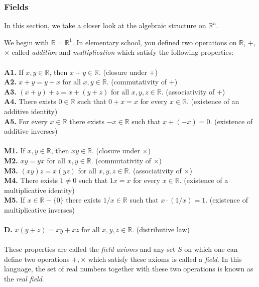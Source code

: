 \documentclass[12pt,letterpaper,reqno]{article}
\numberwithin{equation}{section}
\newcommand{\ti}[1]{\textit{#1}}
\newcommand{\fixme}[1]{{\color{orange}{[#1]}}}
\begin{document}
\subsubsection{Fields}
\fixme{Renumber this section and add proofs.}
In this section, we take a closer look at the algebraic structure on $\mathbb{R}^n$. 

We begin with $\mathbb{R}=\mathbb{R}^1$. In elementary school, you defined two operations on $\mathbb{R}$, $+$, $\times$
called \emph{addition} and \emph{multiplication} which satisfy the following properties: \\
\\
{\bf A1.} If $x,y \in \mathbb{R}$, then $x+y \in \mathbb{R}$. (closure under $+$) \\
{\bf A2.} $x+y=y+x$ for all $x,y \in \mathbb{R}$. (commutativity of $+$)\\
{\bf A3.} $(x+y)+z=x+(y+z)$ for all $x,y,z \in \mathbb{R}$. (associativity of $+$)\\
{\bf A4.} There exists $0 \in \mathbb{R}$ such that $0+x=x$ for every $x \in \mathbb{R}$. (existence of an additive identity)\\
{\bf A5.} For every $x \in \mathbb{R}$ there exists $-x \in \mathbb{R}$ such that $x+(-x)=0$. (existence of additive inverses)\\
\\
{\bf M1.} If $x,y \in \mathbb{R}$, then $xy \in \mathbb{R}$. (closure under $\times$) \\
{\bf M2.} $xy=yx$ for all $x,y \in \mathbb{R}$. (commutativity of $\times$)\\
{\bf M3.} $(xy)z=x(yz)$ for all $x,y,z \in \mathbb{R}$. (associativity of $\times$)\\
{\bf M4.} There exists $1 \neq 0$ such that $1x=x$ for every $x \in \mathbb{R}$. (existence of a multiplicative identity)\\
{\bf M5.} If $x \in \mathbb{R}-\{0\}$ there exists   $1/x \in \mathbb{R}$ such that $x \cdot (1/x)=1$. (existence of multiplicative inverses)\\
\\
{\bf D.} $x(y+z)=xy+xz$ for all $x,y,z \in \mathbb{R}$. (distributive law) \\
\\
These properties are called the \ti{field axioms} and any set $S$ on which one can define two operations $+,\times$ which satisfy these axioms is called a \emph{field}. In this language, the set of real numbers together with these two operations is known as the \emph{real field}.
\end{document}
